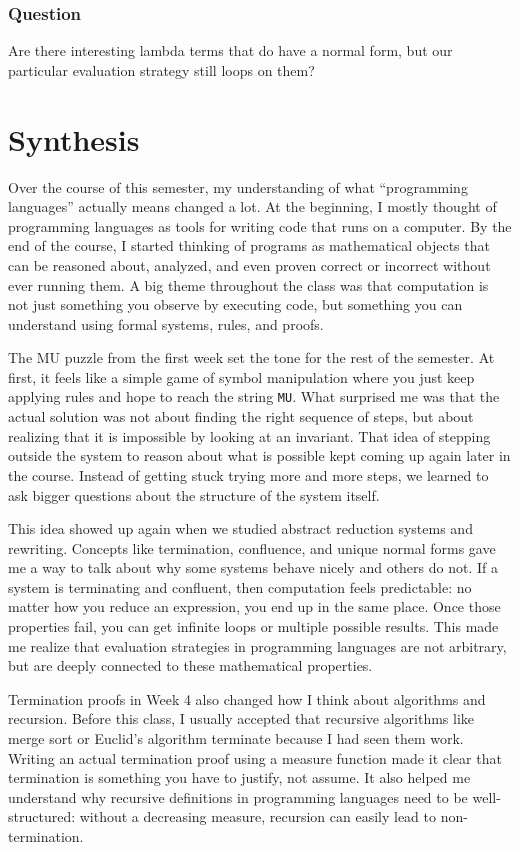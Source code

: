\documentclass{article}
\theoremstyle{theorem}
\theoremstyle{definition}
\theoremstyle{remark}
\begin{document}
\subsubsection*{Question}
Are there interesting lambda terms that do have a normal form, but our particular evaluation strategy still loops on them?

\section{Synthesis}

Over the course of this semester, my understanding of what ``programming languages'' actually means changed a lot. At the beginning, I mostly thought of programming languages as tools for writing code that runs on a computer. By the end of the course, I started thinking of programs as mathematical objects that can be reasoned about, analyzed, and even proven correct or incorrect without ever running them. A big theme throughout the class was that computation is not just something you observe by executing code, but something you can understand using formal systems, rules, and proofs.

The MU puzzle from the first week set the tone for the rest of the semester. At first, it feels like a simple game of symbol manipulation where you just keep applying rules and hope to reach the string \texttt{MU}. What surprised me was that the actual solution was not about finding the right sequence of steps, but about realizing that it is impossible by looking at an invariant. That idea of stepping outside the system to reason about what is possible kept coming up again later in the course. Instead of getting stuck trying more and more steps, we learned to ask bigger questions about the structure of the system itself.

This idea showed up again when we studied abstract reduction systems and rewriting. Concepts like termination, confluence, and unique normal forms gave me a way to talk about why some systems behave nicely and others do not. If a system is terminating and confluent, then computation feels predictable: no matter how you reduce an expression, you end up in the same place. Once those properties fail, you can get infinite loops or multiple possible results. This made me realize that evaluation strategies in programming languages are not arbitrary, but are deeply connected to these mathematical properties.

Termination proofs in Week 4 also changed how I think about algorithms and recursion. Before this class, I usually accepted that recursive algorithms like merge sort or Euclid’s algorithm terminate because I had seen them work. Writing an actual termination proof using a measure function made it clear that termination is something you have to justify, not assume. It also helped me understand why recursive definitions in programming languages need to be well-structured: without a decreasing measure, recursion can easily lead to non-termination.
\end{document}
